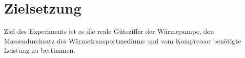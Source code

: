 \section{Zielsetzung}
Ziel des Experiments ist es die reale Güteziffer der Wärmepumpe, den Massendurchsatz des Wärmetransportmediums und vom Kompressor benötigte Leistung zu bestimmen.